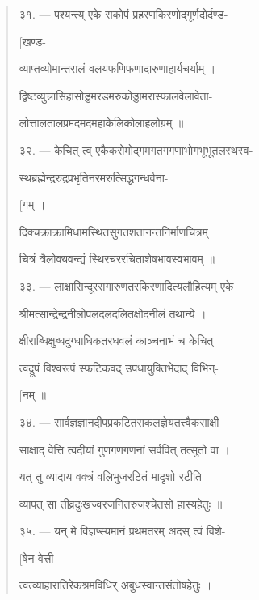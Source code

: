 \documentclass[a4paper, 11pt, oneside, french]{article}
\begin{document}
\begin{quotation}
\texthindi{३१}. --- \texthindi{पश्यन्त्य् एके सकोपं प्रहरणकिरणोद्गूर्णदोर्दण्ड-}

\hspace*{65mm}\texthindi{[खण्ड-}

\texthindi{व्याप्तव्योमान्तरालं वलयफणिफणादारुणाहार्यचर्याम् ।}

\texthindi{द्विष्टव्युत्त्रासिहासोड्डमरडमरुकोड्डामरास्फालवेलावेता-}

\texthindi{लोत्तालतालप्रमदमदमहाकेलिकोलाहलोग्रम् ॥}

\bigskip

\texthindi{३२}. --- \texthindi{केचित् त्व् एकैकरोमोद्गमगतगगणाभोगभूभूतलस्थस्व-}

\texthindi{स्थब्रह्मेन्द्ररुद्रप्रभृतिनरमरुत्सिद्धगन्धर्वना-}

\hspace*{65mm}\texthindi{[गम् ।}

\texthindi{दिक्चक्राक्रामिधामस्थितसुगतशतानन्तनिर्माणचित्रम्}

\texthindi{चित्रं त्रैलोक्यवन्द्यं स्थिरचररचिताशेषभावस्वभावम् ॥}

\bigskip

\texthindi{३३}. --- \texthindi{लाक्षासिन्दूररागारुणतरकिरणादित्यलौहित्यम् एके}

\texthindi{श्रीमत्सान्द्रेन्द्रनीलोपलदलदलितक्षोदनीलं तथान्ये ।}

\texthindi{क्षीराब्धिक्षुब्धदुग्धाधिकतरधवलं काञ्चनाभं च केचित्}

\texthindi{त्वद्रूपं विश्वरूपं स्फटिकवद् उपधायुक्तिभेदाद् विभिन्-}

\hspace*{65mm}\texthindi{[नम् ॥}

\bigskip

\texthindi{३४}. --- \texthindi{सार्वज्ञज्ञानदीपप्रकटितसकलज्ञेयतत्त्वैकसाक्षी}

\texthindi{साक्षाद् वेत्ति त्वदीयां गुणगणगणनां सर्ववित् तत्सुतो वा ।}

\texthindi{यत् तु व्यादाय वक्त्रं वलिभुजरटितं मादृशो रटीति}

\texthindi{व्यापत् सा तीव्रदुःखज्वरजनितरुजश्चेतसो हास्यहेतुः ॥}

\bigskip

\texthindi{३५}. --- \texthindi{यन् मे विज्ञप्स्यमानं प्रथमतरम् अदस् त्वं विशे-}

\hspace*{65mm}\texthindi{[षेन वेत्त्री}

\texthindi{त्वत्व्याहारातिरेकश्रमविधिर् अबुधस्वान्तसंतोषहेतुः ।}


\end{quotation}
\end{document}
